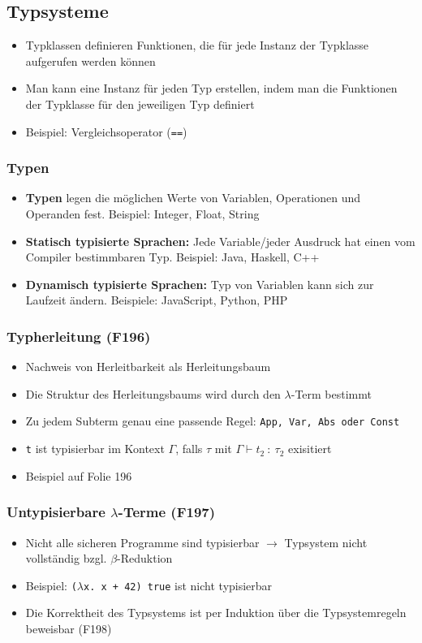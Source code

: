 \subsection{Typsysteme}
\begin{itemize}
	\item Typklassen definieren Funktionen, die für jede Instanz der Typklasse aufgerufen werden können
	\item Man kann eine Instanz für jeden Typ erstellen, indem man die Funktionen der Typklasse für den jeweiligen Typ definiert
	\item Beispiel: Vergleichsoperator (\texttt{==})
\end{itemize}

\subsubsection{Typen}
\begin{itemize}
	\item \textbf{Typen} legen die möglichen Werte von Variablen, Operationen und Operanden fest. Beispiel: Integer, Float, String
	\item \textbf{Statisch typisierte Sprachen:} Jede Variable/jeder Ausdruck hat einen vom Compiler bestimmbaren Typ. Beispiel: Java, Haskell, C++
	\item \textbf{Dynamisch typisierte Sprachen:} Typ von Variablen kann sich zur Laufzeit ändern. Beispiele: JavaScript, Python, PHP
\end{itemize}

\subsubsection{Typherleitung (F196)}
\begin{itemize}
	\item Nachweis von Herleitbarkeit als Herleitungsbaum
	\item Die Struktur des Herleitungsbaums wird durch den \(\lambda\)-Term bestimmt
	\item Zu jedem Subterm genau eine passende Regel: \texttt{App, Var, Abs oder Const}
	\item \texttt{t} ist typisierbar im Kontext \(\Gamma\), falls \(\tau\) mit \(\Gamma\vdash t_2~:~\tau_2\) exisitiert
	\item Beispiel auf Folie 196
\end{itemize}

\subsubsection{Untypisierbare \(\lambda\)-Terme (F197)}
\begin{itemize}
	\item Nicht alle sicheren Programme sind typisierbar \(\rightarrow\) Typsystem nicht vollständig bzgl. \(\beta\)-Reduktion
	\item Beispiel: \texttt{(\(\lambda\)x. x + 42) true} ist nicht typisierbar
	\item Die Korrektheit des Typsystems ist per Induktion über die Typsystemregeln beweisbar (F198)
\end{itemize}


